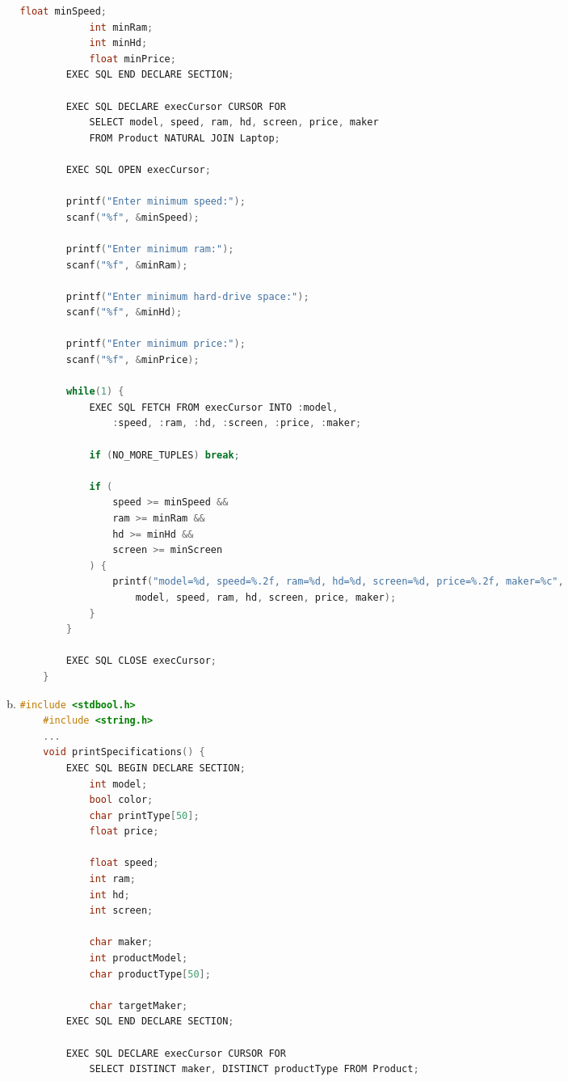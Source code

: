 \documentclass[12pt]{article}
\begin{document}
\begin{enumerate}[1.]
\begin{enumerate}[a)]
\begin{lstlisting}[language=c]
            float minSpeed;
            int minRam;
            int minHd;
            float minPrice;
        EXEC SQL END DECLARE SECTION;

        EXEC SQL DECLARE execCursor CURSOR FOR
            SELECT model, speed, ram, hd, screen, price, maker
            FROM Product NATURAL JOIN Laptop;

        EXEC SQL OPEN execCursor;

        printf("Enter minimum speed:");
        scanf("%f", &minSpeed);

        printf("Enter minimum ram:");
        scanf("%f", &minRam);

        printf("Enter minimum hard-drive space:");
        scanf("%f", &minHd);

        printf("Enter minimum price:");
        scanf("%f", &minPrice);

        while(1) {
            EXEC SQL FETCH FROM execCursor INTO :model,
                :speed, :ram, :hd, :screen, :price, :maker;

            if (NO_MORE_TUPLES) break;

            if (
                speed >= minSpeed &&
                ram >= minRam &&
                hd >= minHd &&
                screen >= minScreen
            ) {
                printf("model=%d, speed=%.2f, ram=%d, hd=%d, screen=%d, price=%.2f, maker=%c",
                    model, speed, ram, hd, screen, price, maker);
            }
        }

        EXEC SQL CLOSE execCursor;
    }
    \end{lstlisting}

        \item

    \begin{lstlisting}[language=c]
    #include <stdbool.h>
    #include <string.h>
    ...
    void printSpecifications() {
        EXEC SQL BEGIN DECLARE SECTION;
            int model;
            bool color;
            char printType[50];
            float price;

            float speed;
            int ram;
            int hd;
            int screen;

            char maker;
            int productModel;
            char productType[50];

            char targetMaker;
        EXEC SQL END DECLARE SECTION;

        EXEC SQL DECLARE execCursor CURSOR FOR
            SELECT DISTINCT maker, DISTINCT productType FROM Product;


\end{lstlisting}
\end{enumerate}
\end{enumerate}
\end{document}
